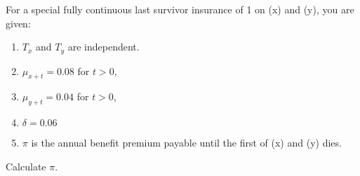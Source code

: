 For a special fully continuous last survivor insurance of 1 on (x) and (y), you are given:
\begin{enumerate}
\item $T_x$ and $T_y$ are independent.
\item $\mu_{x+t} = 0.08$ for $t > 0$, 
\item $\mu_{y+t} = 0.04$ for $t > 0$, 
\item $\delta = 0.06$
\item $\pi$ is the annual benefit premium payable until the 
  first of (x) and (y) dies.
\end{enumerate}
Calculate $\pi$.
